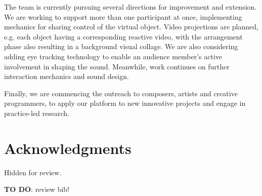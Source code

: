 \documentclass{nime-alternate}
\begin{document}
The team is currently pursuing several directions for improvement and extension. We are working to support more than one participant at once, implementing mechanics for sharing control of the virtual object. Video projections are planned, e.g. each object having a corresponding reactive video, with the arrangement phase also resulting in a background visual collage. We are also considering adding eye tracking technology to enable an audience member's active involvement in shaping the sound. Meanwhile, work continues on further interaction mechanics and sound design.



Finally, we are commencing the outreach to composers, artists and creative programmers, to apply our platform to new innovative projects and engage in practice-led research.


\section{Acknowledgments}
Hidden for review.

%

 
\textbf{TO DO}: review bib!

\end{document}
